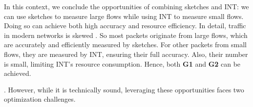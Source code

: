 In this context, we conclude the opportunities of combining sketches and INT: we can use sketches to measure large flows while using INT to measure small flows. Doing so can achieve both high accuracy and resource efficiency. In detail, traffic in modern networks is skewed \cite{roy2015inside,huang2021toward,caida,benson2010network,yang2018elastic}. So most packets originate from large flows, which are accurately and efficiently measured by sketches. For other packets from small flows, they are measured by INT, ensuring their full accuracy. Also, their number is small, limiting INT's resource consumption. Hence, both \textbf{G1} and \textbf{G2} can be achieved. 

.
However, while it is technically sound, leveraging these opportunities faces two optimization challenges.

